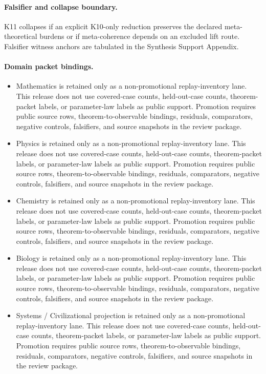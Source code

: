 \paragraph{Falsifier and collapse boundary.}
K11 collapses if an explicit K10-only reduction preserves the declared meta-theoretical burdens or if meta-coherence depends on an excluded lift route.
Falsifier witness anchors are tabulated in the Synthesis Support Appendix.

\paragraph{Domain packet bindings.}
\begin{itemize}[leftmargin=1.6em,nosep]
\item Mathematics is retained only as a non-promotional replay-inventory lane. This release does not use covered-case counts, held-out-case counts, theorem-packet labels, or parameter-law labels as public support. Promotion requires public source rows, theorem-to-observable bindings, residuals, comparators, negative controls, falsifiers, and source snapshots in the review package.
\item Physics is retained only as a non-promotional replay-inventory lane. This release does not use covered-case counts, held-out-case counts, theorem-packet labels, or parameter-law labels as public support. Promotion requires public source rows, theorem-to-observable bindings, residuals, comparators, negative controls, falsifiers, and source snapshots in the review package.
\item Chemistry is retained only as a non-promotional replay-inventory lane. This release does not use covered-case counts, held-out-case counts, theorem-packet labels, or parameter-law labels as public support. Promotion requires public source rows, theorem-to-observable bindings, residuals, comparators, negative controls, falsifiers, and source snapshots in the review package.
\item Biology is retained only as a non-promotional replay-inventory lane. This release does not use covered-case counts, held-out-case counts, theorem-packet labels, or parameter-law labels as public support. Promotion requires public source rows, theorem-to-observable bindings, residuals, comparators, negative controls, falsifiers, and source snapshots in the review package.
\item Systems / Civilizational projection is retained only as a non-promotional replay-inventory lane. This release does not use covered-case counts, held-out-case counts, theorem-packet labels, or parameter-law labels as public support. Promotion requires public source rows, theorem-to-observable bindings, residuals, comparators, negative controls, falsifiers, and source snapshots in the review package.

\end{itemize}
